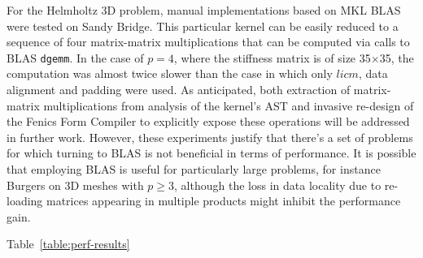 \documentclass[conference]{IEEEtran}
\begin{document}
For the Helmholtz 3D problem, manual implementations based on MKL BLAS were tested on Sandy Bridge. This particular kernel can be easily reduced to a sequence of four matrix-matrix multiplications that can be computed via calls to BLAS \texttt{dgemm}. In the case of $p=4$, where the stiffness matrix is of size 35$\times$35, the computation was almost twice slower than the case in which only $licm$, data alignment and padding were used. As anticipated, both extraction of matrix-matrix multiplications from analysis of the kernel's AST and invasive re-design of the Fenics Form Compiler to explicitly expose these operations will be addressed in further work. However, these experiments justify that there's a set of problems for which turning to BLAS is not beneficial in terms of performance. It is possible that employing BLAS is useful for particularly large problems, for instance Burgers on 3D meshes with $p \geq 3$, although the loss in data locality due to re-loading matrices appearing in multiple products might inhibit the performance gain. 

Table~\ref{table:perf-results}



\end{document}
